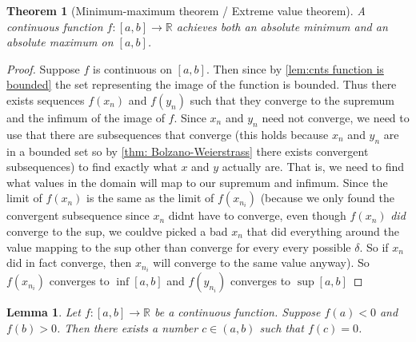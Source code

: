 \documentclass{article}
\newtheorem{theorem}{Theorem}[section]
\newtheorem{lemma}{Lemma}[section]
\theoremstyle{definition}
\theoremstyle{remark}
\begin{document}
\vspace{.5cm}

\begin{theorem}[Minimum-maximum theorem / Extreme value theorem]\label{thm:evt}
A continuous function $f : [a,b] \to \mathbb{R}$ achieves both an absolute minimum and an absolute maximum on $[a,b]$.
\end{theorem}

\begin{proof}
Suppose $f$ is continuous on $[a,b]$. 
Then since by \ref{lem:cnts function is bounded} the set representing the image of the function is bounded. 
Thus there exists sequences $f(x_n)$ and $f(y_n)$ such that they converge to the supremum and the infimum of the image of $f$.
Since $x_n$ and $y_n$ need not converge, we need to use that there are subsequences that converge (this holds because $x_n$ and $y_n$ are in a bounded set so by \ref{thm: Bolzano-Weierstrass} there exists convergent subsequences) to find exactly what $x$ and $y$ actually are. That is, 
we need to find what values in the domain will map to our supremum and infimum. Since the limit of $f(x_n)$ is the same as the limit of $f(x_{n_i})$ (because we only found 
the convergent subsequence since $x_n$ didnt have to converge, even though $f(x_n)$ \emph{did} converge to the sup, 
we couldve picked a bad $x_n$ that did everything around the value 
mapping to the sup other than converge for every every possible $\delta$. So if $x_n$ did in fact converge, then $x_{n_i}$ will converge to the same value anyway). 
So $f(x_{n_i})$ converges to $\inf[a,b]$ and 
$f(y_{n_i})$ converges to $\sup[a,b]$
\end{proof}



\vspace{.5cm}



\begin{lemma}\label{lem:ivt at c = 0}
Let $f : [a,b] \to \mathbb{R}$ be a continuous function. Suppose $f(a) < 0$ and $f(b) > 0$. Then there exists a number $c \in (a,b)$ such that $f(c) = 0$.
\end{lemma}
\end{document}
